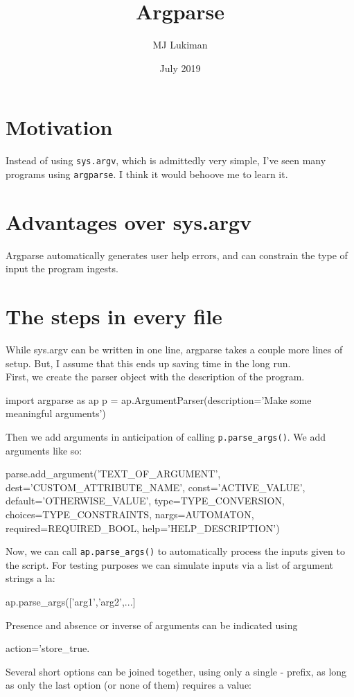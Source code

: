 \documentclass{article}
\title{Argparse}
\author{MJ Lukiman}
\date{July 2019}
\begin{document}
\maketitle

\section{Motivation}

Instead of using \texttt{sys.argv}, which is admittedly very simple, I've seen many programs using \texttt{argparse}. I think it would behoove me to learn it.

\section{Advantages over sys.argv}
Argparse automatically generates user help errors, and can constrain the type of input the program ingests.

\section{The steps in every file}

While sys.argv can be written in one line, argparse takes a couple more lines of setup. But, I assume that this ends up saving time in the long run.\\
First, we create the parser object with the description of the program.
\begin{python}
import argparse as ap
p = ap.ArgumentParser(description='Make some meaningful arguments')
\end{python}
Then we add arguments in anticipation of calling \texttt{p.parse_args()}. We add arguments like so:
\begin{python}
parse.add_argument('TEXT_OF_ARGUMENT', dest='CUSTOM_ATTRIBUTE_NAME', const='ACTIVE_VALUE', default='OTHERWISE_VALUE', type=TYPE_CONVERSION, choices=TYPE_CONSTRAINTS, nargs=AUTOMATON, required=REQUIRED_BOOL, help='HELP_DESCRIPTION')
\end{python}
Now, we can call \texttt{ap.parse_args()} to automatically process the inputs given to the script. For testing purposes we can simulate inputs via a list of argument strings a la:
\begin{python}
ap.parse_args(['arg1','arg2',...]
\end{python}
Presence and absence or inverse of arguments can be indicated using \begin{python}
action='store_true.
\end{python}
Several short options can be joined together, using only a single - prefix, as long as only the last option (or none of them) requires a value:
\end{document}
